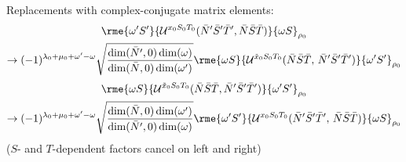 \documentclass[%
  aps,%
  prc,%
  showpacs,%
  superscriptaddress,%
  onecolumn,%
  notitlepage,%
  11pt,%
  floatfix,%
  amsmath,%
  amssymb,%
]{revtex4-2}
\begin{document}
\clearpage

Replacements with complex-conjugate matrix elements:
\begin{multline*}
  \rme{\omega'S'}{\mathcal{U}^{x_0S_0T_0}(\bar{N}'\bar{S}'\bar{T}',\bar{N}\bar{S}\bar{T})}{\omega S}_{\rho_0} \\ \rightarrow
(-1)^{\lambda_0+\mu_0+\omega'-\omega}\sqrt{\frac{\dim(\bar{N}',0)\dim(\omega)}{\dim(\bar{N},0)\dim(\omega')}}
\rme{\omega S}{\mathcal{U}^{\tilde{x}_0S_0T_0}(\bar{N}\bar{S}\bar{T},\, \bar{N}'\bar{S}'\bar{T}')}{\omega'S'}_{\rho_0}
\end{multline*}
\begin{multline*}
  \rme{\omega S}{\mathcal{U}^{\tilde{x}_0S_0T_0}(\bar{N}\bar{S}\bar{T},\bar{N}'\bar{S}'\bar{T}')}{\omega'S'}_{\rho_0} \\ \rightarrow
  (-1)^{\lambda_0+\mu_0+\omega'-\omega} \sqrt{\frac{\dim(\bar{N},0)\dim(\omega')}{\dim(\bar{N}',0)\dim(\omega)}}
  \rme{\omega'S'}{\mathcal{U}^{x_0S_0T_0}(\bar{N}'\bar{S}'\bar{T}',\, \bar{N}\bar{S}\bar{T})}{\omega S}_{\rho_0}
\end{multline*}
($S$- and $T$-dependent factors cancel on left and right)
\end{document}
